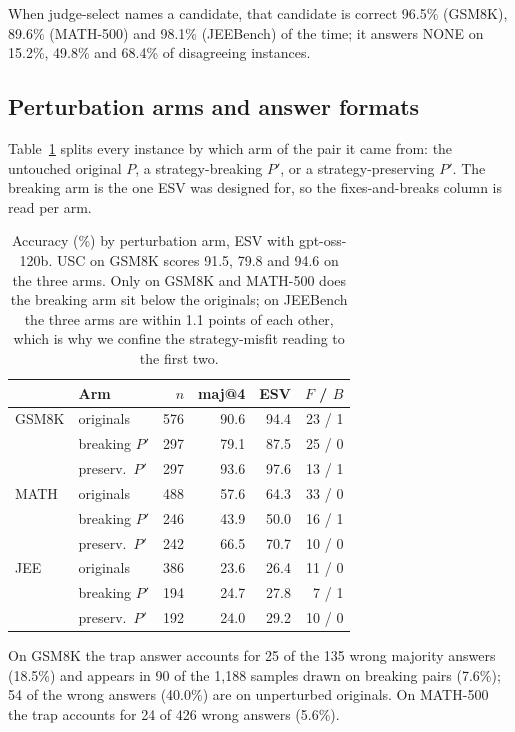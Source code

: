 \documentclass[letterpaper]{article} %
\newcommand{\method}{\textsc{ESV}}   %
\begin{document}
When judge-select names a candidate, that candidate is correct 96.5\% (GSM8K), 89.6\% (MATH-500) and 98.1\% (JEEBench) of the time; it answers NONE on 15.2\%, 49.8\% and 68.4\% of disagreeing instances.

\subsection{Perturbation arms and answer formats}
\label{app:arms}

Table~\ref{tab:arms} splits every instance by which arm of the pair it came
from: the untouched original $P$, a strategy-breaking $P'$, or a
strategy-preserving $P'$. The breaking arm is the one \method{} was designed
for, so the fixes-and-breaks column is read per arm.

\begin{table}[t]
\centering
\small
\setlength{\tabcolsep}{3.5pt}
\begin{tabular}{@{}llrrrr@{}}
\toprule
 & Arm & $n$ & maj@4 & \method{} & $F$ / $B$ \\
\midrule
GSM8K & originals & 576 & 90.6 & 94.4 & 23 / 1 \\
      & breaking $P'$ & 297 & 79.1 & 87.5 & 25 / 0 \\
      & preserv.\ $P'$ & 297 & 93.6 & 97.6 & 13 / 1 \\
\midrule
MATH  & originals & 488 & 57.6 & 64.3 & 33 / 0 \\
      & breaking $P'$ & 246 & 43.9 & 50.0 & 16 / 1 \\
      & preserv.\ $P'$ & 242 & 66.5 & 70.7 & 10 / 0 \\
\midrule
JEE   & originals & 386 & 23.6 & 26.4 & 11 / 0 \\
      & breaking $P'$ & 194 & 24.7 & 27.8 & 7 / 1 \\
      & preserv.\ $P'$ & 192 & 24.0 & 29.2 & 10 / 0 \\
\bottomrule
\end{tabular}
\caption{Accuracy (\%) by perturbation arm, ESV with gpt-oss-120b. USC on GSM8K scores 91.5, 79.8 and 94.6 on the three arms. Only on GSM8K and MATH-500 does the breaking arm sit below the originals; on JEEBench the three arms are within 1.1 points of each other, which is why we confine the strategy-misfit reading to the first two.}
\label{tab:arms}
\end{table}

On GSM8K the trap answer accounts for 25 of the 135 wrong majority answers (18.5\%) and appears in 90 of the 1{,}188 samples drawn on breaking pairs (7.6\%); 54 of the wrong answers (40.0\%) are on unperturbed originals. On MATH-500 the trap accounts for 24 of 426 wrong answers (5.6\%).
\end{document}
